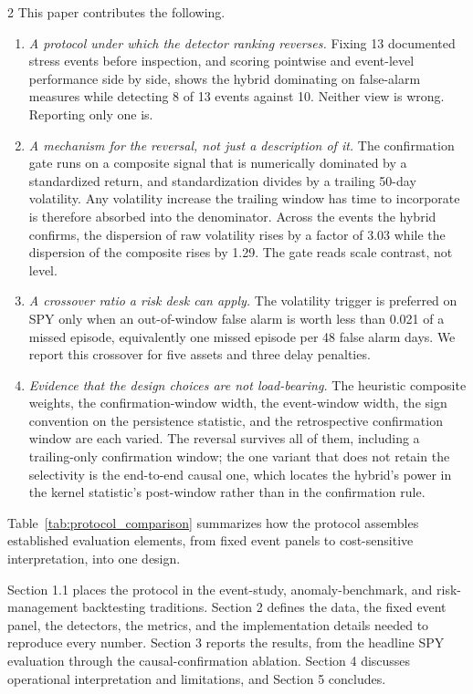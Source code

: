 \documentclass{book}
\begin{document}
\begin{multicols}{2}
This paper contributes the following.
\begin{enumerate}
\item \textit{A protocol under which the detector ranking reverses.} Fixing 13 documented stress events before inspection, and scoring pointwise and event-level performance side by side, shows the hybrid dominating on false-alarm measures while detecting 8 of 13 events against 10. Neither view is wrong. Reporting only one is.
\item \textit{A mechanism for the reversal, not just a description of it.} The confirmation gate runs on a composite signal that is numerically dominated by a standardized return, and standardization divides by a trailing 50-day volatility. Any volatility increase the trailing window has time to incorporate is therefore absorbed into the denominator. Across the events the hybrid confirms, the dispersion of raw volatility rises by a factor of 3.03 while the dispersion of the composite rises by 1.29. The gate reads scale contrast, not level.
\item \textit{A crossover ratio a risk desk can apply.} The volatility trigger is preferred on SPY only when an out-of-window false alarm is worth less than 0.021 of a missed episode, equivalently one missed episode per 48 false alarm days. We report this crossover for five assets and three delay penalties.
\item \textit{Evidence that the design choices are not load-bearing.} The heuristic composite weights, the confirmation-window width, the event-window width, the sign convention on the persistence statistic, and the retrospective confirmation window are each varied. The reversal survives all of them, including a trailing-only confirmation window; the one variant that does not retain the selectivity is the end-to-end causal one, which locates the hybrid's power in the kernel statistic's post-window rather than in the confirmation rule.
\end{enumerate}

Table~\ref{tab:protocol_comparison} summarizes how the protocol assembles established evaluation elements, from fixed event panels to cost-sensitive interpretation, into one design.

Section 1.1 places the protocol in the event-study, anomaly-benchmark, and risk-management backtesting traditions. Section 2 defines the data, the fixed event panel, the detectors, the metrics, and the implementation details needed to reproduce every number. Section 3 reports the results, from the headline SPY evaluation through the causal-confirmation ablation. Section 4 discusses operational interpretation and limitations, and Section 5 concludes.
\end{multicols}
\end{document}
